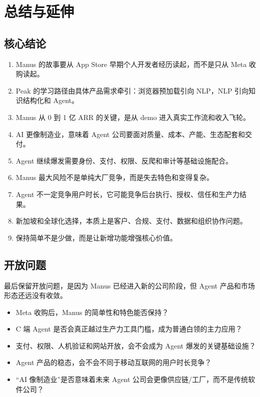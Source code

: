 \section{总结与延伸}

\subsection{核心结论}

\begin{enumerate}
\item Manus 的故事要从 App Store 早期个人开发者经历读起，而不是只从 Meta 收购读起。
\item Peak 的学习路径由具体产品需求牵引：浏览器预加载引向 NLP，NLP 引向知识结构化和 Agent。
\item Manus 从 0 到 1 亿 ARR 的关键，是从 demo 进入真实工作流和收入飞轮。
\item AI 更像制造业，意味着 Agent 公司要面对质量、成本、产能、生态配套和交付。
\item Agent 继续爆发需要身份、支付、权限、反爬和审计等基础设施配合。
\item Manus 最大风险不是单纯大厂竞争，而是失去特色和变得复杂。
\item Agent 不一定竞争用户时长，它可能竞争后台执行、授权、信任和生产力结果。
\item 新加坡和全球化选择，本质上是客户、合规、支付、数据和组织协作问题。
\item 保持简单不是少做，而是让新增功能增强核心价值。
\end{enumerate}

\subsection{开放问题}

最后保留开放问题，是因为 Manus 已经进入新的公司阶段，但 Agent 产品和市场形态还远没有收敛。

\begin{itemize}
\item Meta 收购后，Manus 的简单性和特色能否保持？
\item C 端 Agent 是否会真正越过生产力工具门槛，成为普通白领的主力应用？
\item 支付、权限、人机验证和网站开放，会不会成为 Agent 爆发的关键基础设施？
\item Agent 产品的稳态，会不会不同于移动互联网的用户时长竞争？
\item “AI 像制造业”是否意味着未来 Agent 公司会更像供应链/工厂，而不是传统软件公司？
\end{itemize}

